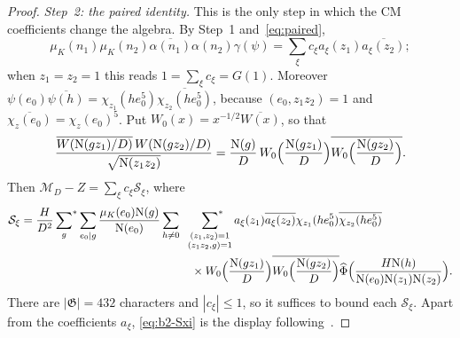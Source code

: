 \documentclass[11pt]{article}
\numberwithin{equation}{section}
\newcommand{\N}{\mathrm N}
\newcommand{\muk}{\mu_K}
\newcommand{\ssum}{\sideset{}{^*}\sum}
\begin{document}
\begin{proof}
\emph{Step~2: the paired identity.} This is the only step in which the CM coefficients
change the algebra. By Step~1 and~\eqref{eq:paired},
\begin{equation}\label{eq:d046}
 \muk(n_1)\muk(n_2)\overline{\alpha(n_1)}\alpha(n_2)\gamma(\psi)
 =\sum_\xi c_\xi a_\xi(z_1)\overline{a_\xi(z_2)};
\end{equation}
when $z_1=z_2=1$ this reads $1=\sum_\xi c_\xi=G(1)$. Moreover
$\psi(e_0)\overline{\psi(h)}=\chi_{z_1}(he_0^5)\overline{\chi_{z_2}(he_0^5)}$, because
$(e_0,z_1z_2)=1$ and $\overline{\chi_z(e_0)}=\chi_z(e_0)^5$. Put
$W_0(x)=x^{-1/2}\overline{W(x)}$, so that
\begin{equation}\label{eq:d047}
 \frac{\overline{W(\N(gz_1)/D)}\,W(\N(gz_2)/D)}{\sqrt{\N(z_1z_2)}}
 =\frac{\N(g)}D\,W_0\Bigl(\frac{\N(gz_1)}D\Bigr)\overline{W_0\Bigl(\frac{\N(gz_2)}D\Bigr)}.
\end{equation}
Then $\mathcal M_D-Z=\sum_\xi c_\xi\mathcal S_\xi$, where
\begin{equation}\label{eq:b2-Sxi}
\begin{split}
 \mathcal S_\xi=\frac H{D^2}\ssum_g\sum_{e_0\mid g}\frac{\muk(e_0)\N(g)}{\N(e_0)}
 \sum_{h\ne0}\quad
 &\ssum_{\substack{(z_1,z_2)=1\\(z_1z_2,g)=1}}a_\xi(z_1)\overline{a_\xi(z_2)}
  \chi_{z_1}(he_0^5)\overline{\chi_{z_2}(he_0^5)}\\
 &\times W_0\Bigl(\frac{\N(gz_1)}D\Bigr)\overline{W_0\Bigl(\frac{\N(gz_2)}D\Bigr)}
 \widehat\Phi\Bigl(\frac{H\N(h)}{\N(e_0)\N(z_1)\N(z_2)}\Bigr).
\end{split}
\end{equation}
There are $|\mathfrak G|=432$ characters and $|c_\xi|\le1$, so it suffices to bound each
$\mathcal S_\xi$. Apart from the coefficients $a_\xi$, \eqref{eq:b2-Sxi} is the display
following~\cite[(4.15)]{OAI1112}.


\end{proof}
\end{document}
